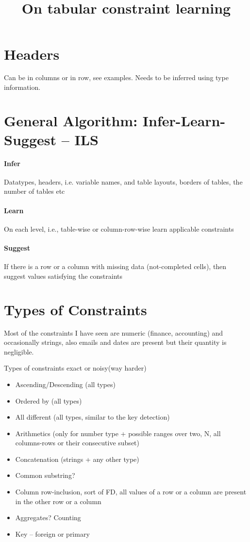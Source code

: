 \documentclass{article}
\title{On tabular constraint learning}
\begin{document}
\maketitle
\vspace{-15pt}
\section{Headers}
Can be in columns or in row, see examples. Needs to be inferred using type information.
\vspace{-10pt}
\section{General Algorithm: Infer-Learn-Suggest -- ILS }
\paragraph{Infer} Datatypes, headers, i.e. variable names, and table layouts, borders of tables, the number of tables etc
\vspace{-10pt}
\paragraph{Learn} On each level, i.e., table-wise or column-row-wise learn applicable constraints
\vspace{-10pt}
\paragraph{Suggest} If there is a row or a column with missing data (not-completed cells), then suggest values satisfying the constraints
\vspace{-10pt}
\section*{Types of Constraints}
Most of the constraints I have seen are numeric (finance, accounting) and occasionally strings, also emails and dates are present but their quantity is negligible.

Types of constraints exact or noisy(way harder)
\begin{itemize}
  \item Ascending/Descending (all types)
  \item Ordered by (all types)
  \item All different (all types, similar to the key detection)
  \item Arithmetics (only for number type + possible ranges over two, N, all columns-rows or their consecutive subset)
  \item Concatenation (strings + any other type)
  \item Common substring? 
  \item Column row-inclusion, sort of FD, all values of a row or a column are present in the other row or a column
  \item Aggregates? Counting 
  \item Key -- foreign or primary
\end{itemize}
\end{document}
